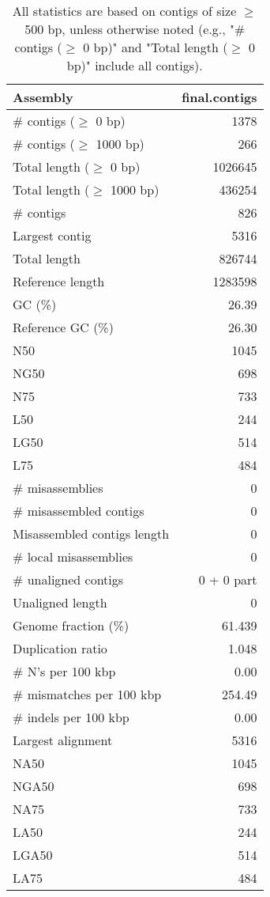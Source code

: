 \documentclass[12pt,a4paper]{article}
\begin{document}
\begin{table}[ht]
\begin{center}
\caption{All statistics are based on contigs of size $\geq$ 500 bp, unless otherwise noted (e.g., "\# contigs ($\geq$ 0 bp)" and "Total length ($\geq$ 0 bp)" include all contigs).}
\begin{tabular}{|l*{1}{|r}|}
\hline
Assembly & final.contigs \\ \hline
\# contigs ($\geq$ 0 bp) & 1378 \\ \hline
\# contigs ($\geq$ 1000 bp) & 266 \\ \hline
Total length ($\geq$ 0 bp) & 1026645 \\ \hline
Total length ($\geq$ 1000 bp) & 436254 \\ \hline
\# contigs & 826 \\ \hline
Largest contig & 5316 \\ \hline
Total length & 826744 \\ \hline
Reference length & 1283598 \\ \hline
GC (\%) & 26.39 \\ \hline
Reference GC (\%) & 26.30 \\ \hline
N50 & 1045 \\ \hline
NG50 & 698 \\ \hline
N75 & 733 \\ \hline
L50 & 244 \\ \hline
LG50 & 514 \\ \hline
L75 & 484 \\ \hline
\# misassemblies & 0 \\ \hline
\# misassembled contigs & 0 \\ \hline
Misassembled contigs length & 0 \\ \hline
\# local misassemblies & 0 \\ \hline
\# unaligned contigs & 0 + 0 part \\ \hline
Unaligned length & 0 \\ \hline
Genome fraction (\%) & 61.439 \\ \hline
Duplication ratio & 1.048 \\ \hline
\# N's per 100 kbp & 0.00 \\ \hline
\# mismatches per 100 kbp & 254.49 \\ \hline
\# indels per 100 kbp & 0.00 \\ \hline
Largest alignment & 5316 \\ \hline
NA50 & 1045 \\ \hline
NGA50 & 698 \\ \hline
NA75 & 733 \\ \hline
LA50 & 244 \\ \hline
LGA50 & 514 \\ \hline
LA75 & 484 \\ \hline
\end{tabular}
\end{center}
\end{table}
\end{document}
